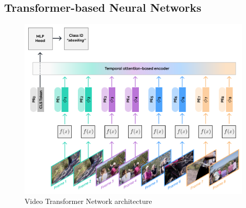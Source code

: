 \subsection{Transformer-based Neural Networks}

\citet{sun2019learning}

\citet{neimark2021video}

\begin{figure}[!ht]
    \centering
    \includegraphics[width=.7\textwidth]{literature/imgs/ext-vtn.png}
    \caption{Video Transformer Network architecture \cite{neimark2021video}}
    \label{fig:ext-vtn}
\end{figure}